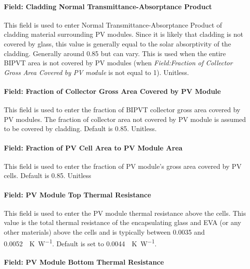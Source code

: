 \paragraph{Field: Cladding Normal Transmittance-Absorptance Product}\label{BIPVT-field-cladding-tau-alpha}

This field is used to enter Normal Transmittance-Absorptance Product of cladding material surrounding PV modules. Since it is likely that cladding is not covered by glass, this value is generally equal to the solar absorptivity of the cladding. Generally around 0.85 but can vary. This is used when the entire BIPVT area is not covered by PV modules (when \textit{Field:Fraction of Collector Gross Area Covered by PV module}  is not equal to 1). Unitless.


\paragraph{Field: Fraction of Collector Gross Area Covered by PV Module}\label{BIPVT-field-fraction-module}

This field is used to enter the fraction of BIPVT collector gross area covered by PV modules. The fraction of collector area not covered by PV module is assumed to be covered by cladding. Default is 0.85. Unitless.

\paragraph{Field: Fraction of PV Cell Area to PV Module Area}\label{BIPVT-field-fraction-PVcell}

This field is used to enter the fraction of PV module’s gross area covered by PV cells. Default is 0.85. Unitless

\paragraph{Field: PV Module Top Thermal Resistance}\label{BIPVT-field-PVmodule-resistance-top}

This field is used to enter the PV module thermal resistance above the cells. This value is the total thermal resistance of the encapsulating glass and EVA (or any other materials) above the cells and is typically between 0.0035 and \SI{0.0052}{\area\K\per\watt}. Default is set to \SI{0.0044}{\area\K\per\watt}.


\paragraph{Field: PV Module Bottom Thermal Resistance}\label{BIPVT-field-PVmodule-resistance-bottom}

